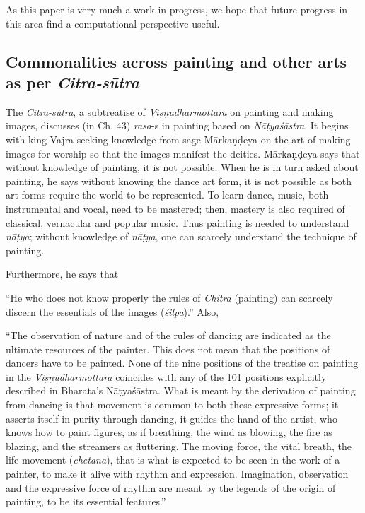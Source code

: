 As this paper is very much a work in progress, we hope that future progress in this area find a computational perspective useful.

\subsection{Commonalities across painting and other arts as per \textsl{Citra-sūtra}}\label{chap3-sec1.3}

The \textsl{Citra-sūtra}, a subtreatise of \textsl{Viṣṇudharmottara} on painting and making images, discusses (in Ch. 43) \textsl{rasa}-s in painting based on \textsl{Nāṭyaśāstra}. It begins with king Vajra seeking knowledge from sage Mārkaṇḍeya on the art of making images for worship so that the images manifest the deities. Mārkaṇḍeya says that without knowledge of painting, it is not possible. When he is in turn asked about painting, he says without knowing the dance art form, it is not possible as both art forms require the world to be represented. To learn dance, music, both instrumental and vocal, need to be mastered; then, mastery is also required of classical, vernacular and popular music. Thus painting is needed to understand \textsl{nāṭya}; without knowledge of \textsl{nāṭya}, one can scarcely understand the technique of painting. 

Furthermore, he says that

\begin{myquote}
“He who does not know properly the rules of \textsl{Chitra} (painting) can scarcely discern the essentials of the images (\textsl{śilpa}).” Also, 

“The observation of nature and of the rules of dancing are indicated as the ultimate resources of the painter. This does not mean that the positions of dancers have to be painted. None of the nine positions of the treatise on painting in the \textsl{Viṣṇudharmottara} coincides with any of the 101 positions explicitly described in Bharata's Nāṭyaśāstra. What is meant by the derivation of painting from dancing is that movement is common to both these expressive forms; it asserts itself in purity through dancing, it guides the hand of the artist, who knows how to paint figures, as if breathing, the wind as blowing, the fire as blazing, and the streamers as fluttering. The moving force, the vital breath, the life-movement (\textsl{chetana}), that is what is expected to be seen in the work of a painter, to make it alive with rhythm and expression. Imagination, observation and the expressive force of rhythm are meant by the legends of the origin of painting, to be its essential features.” 
\end{myquote}

